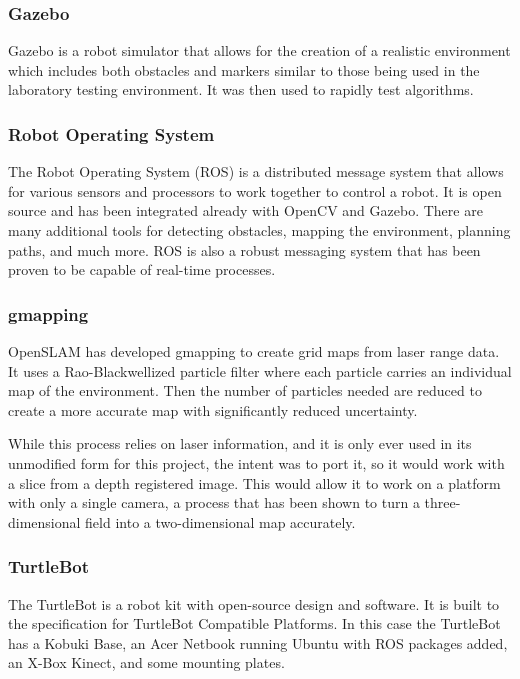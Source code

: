 \documentclass{article}[12]
\begin{document}
		\subsubsection{Gazebo}
		
		Gazebo is a robot simulator that allows for the creation of a realistic environment which includes both obstacles and markers similar to those being used in the laboratory testing environment. It was then used to rapidly test algorithms.
		
		\subsubsection{Robot Operating System}
		
		The Robot Operating System (ROS) is a distributed message system that allows for various sensors and processors to work together to control a robot. It is open source and has been integrated already with OpenCV and Gazebo. There are many additional tools for detecting obstacles, mapping the environment, planning paths, and much more. ROS is also a robust messaging system that has been proven to be capable of real-time processes.
		
		\subsubsection{gmapping}
		
		OpenSLAM has developed gmapping to create grid maps from laser range data. It uses a Rao-Blackwellized particle filter where each particle carries an individual map of the environment. Then the number of particles needed are reduced to create a more accurate map with significantly reduced uncertainty.\cite{grisetti_stachniss_burgard}
		
		While this process relies on laser information, and it is only ever used in its unmodified form for this project, the intent was to port it, so it would work with a slice from a depth registered image. This would allow it to work on a platform with only a single camera, a process that has been shown to turn a three-dimensional field into a two-dimensional map accurately.\cite{2018nanomap}
		
		
		
		\subsubsection{TurtleBot}
		
		The TurtleBot is a robot kit with open-source design and software. It is built to the specification for TurtleBot Compatible Platforms. \cite{wise_foote_2011} In this case the TurtleBot has a Kobuki Base, an Acer Netbook running Ubuntu with ROS packages added, an X-Box Kinect, and some mounting plates. 
		
\end{document}
